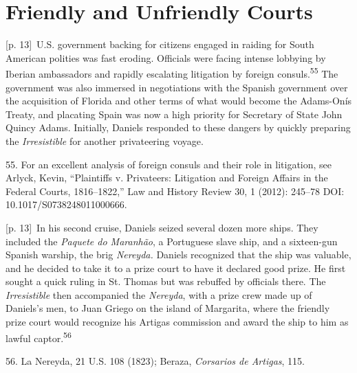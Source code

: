 \documentclass[10pt,a4paper]{article}
\begin{document}
\section*{Friendly and Unfriendly Courts}
{\scriptsize\color{gray} [p. 13]}\ U.S. government backing for citizens engaged in raiding for South American polities was fast eroding. Officials were facing intense lobbying by Iberian ambassadors and rapidly escalating litigation by foreign consuls.\nobreak\textsuperscript{55} The government was also immersed in negotiations with the Spanish government over the acquisition of Florida and other terms of what would become the Adams-Onís Treaty, and placating Spain was now a high priority for Secretary of State John Quincy Adams. Initially, Daniels responded to these dangers by quickly preparing the \textit{Irresistible} for another privateering voyage.\par{\small 55. For an excellent analysis of foreign consuls and their role in litigation, see Arlyck, Kevin, “Plaintiffs v. Privateers: Litigation and Foreign Affairs in the Federal Courts, 1816–1822,” Law and History Review 30, 1 (2012): 245–78 DOI: 10.1017/S0738248011000666.\par}
{\scriptsize\color{gray} [p. 13]}\ In his second cruise, Daniels seized several dozen more ships. They included the \textit{Paquete do Maranhão}, a Portuguese slave ship, and a sixteen-gun Spanish warship, the brig \textit{Nereyda.} Daniels recognized that the ship was valuable, and he decided to take it to a prize court to have it declared good prize. He first sought a quick ruling in St. Thomas but was rebuffed by officials there. The \textit{Irresistible} then accompanied the \textit{Nereyda}, with a prize crew made up of Daniels’s men, to Juan Griego on the island of Margarita, where the friendly prize court would recognize his Artigas commission and award the ship to him as lawful captor.\nobreak\textsuperscript{56}\par{\small 56. La Nereyda, 21 U.S. 108 (1823); Beraza, \textit{Corsarios de Artigas}, 115.\par}
\end{document}
